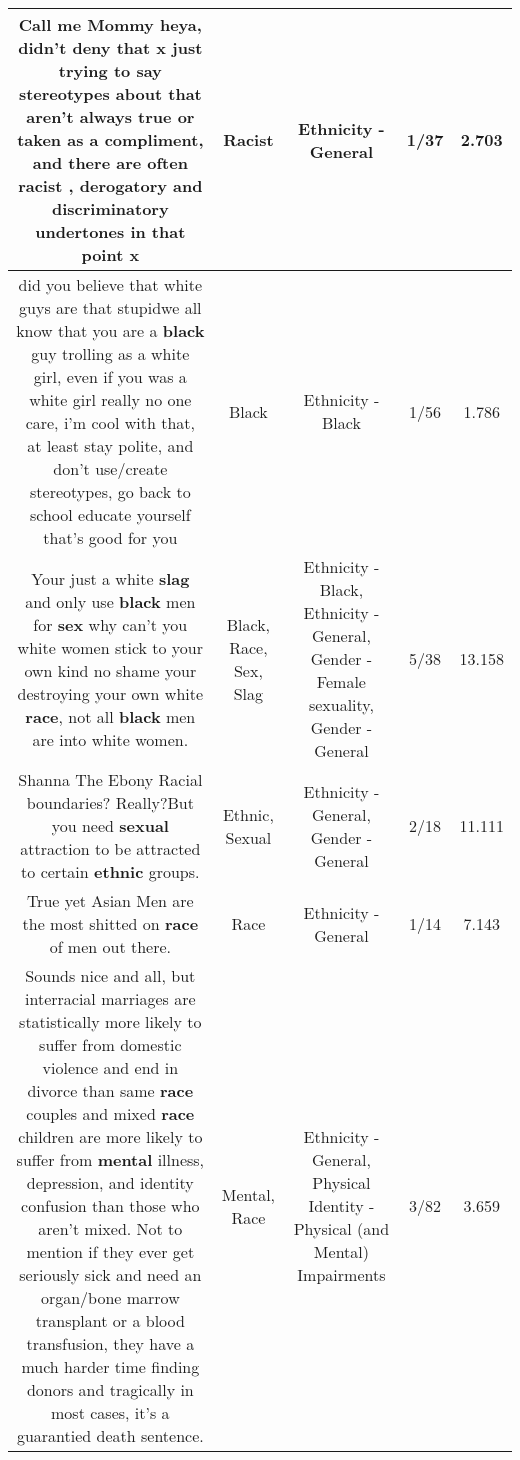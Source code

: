 \documentclass[11pt]{article}
\newlength\mylength
\begin{document}
\begin{center}
\begin{longtable}{|C{.65\mylength}|C{.30\mylength}|C{.12\mylength}|C{.12\mylength}|C{.12\mylength}|}
  \small Call me Mommy heya, didn't deny that x just trying to say stereotypes about that aren't always true or taken as a compliment, and there are often \textbf{racist} , derogatory and discriminatory undertones in that point x\normalsize   & Racist & Ethnicity - General & 1/37 & 2.703 \\  \hline
  \small did you believe that white guys are that stupidwe all know that you are a \textbf{black} guy trolling as a white girl, even if you was a white girl really no one care, i'm cool with that, at least stay polite, and don't use/create stereotypes, go back to school educate yourself that's good for you\normalsize   & Black & Ethnicity - Black & 1/56 & 1.786 \\  \hline
  \small Your just a white \textbf{slag} and only use \textbf{black} men for \textbf{sex} why can't you white women stick to your own kind  no shame your destroying your own white \textbf{race},  not all \textbf{black} men are into white women.\normalsize   & Black, Race, Sex, Slag & Ethnicity - Black, Ethnicity - General, Gender - Female sexuality, Gender - General & 5/38 & 13.158 \\  \hline
  \small Shanna The Ebony Racial boundaries? Really?But you need \textbf{sexual} attraction to be attracted to certain \textbf{ethnic} groups.\normalsize   & Ethnic, Sexual & Ethnicity - General, Gender - General & 2/18 & 11.111 \\  \hline
  \small True yet Asian Men are the most shitted on \textbf{race} of men out there.\normalsize   & Race & Ethnicity - General & 1/14 & 7.143 \\  \hline
  \small Sounds nice and all, but interracial marriages are statistically more likely to suffer from domestic violence and end in divorce than same \textbf{race} couples and mixed \textbf{race} children are more likely to suffer from \textbf{mental} illness, depression, and identity confusion than those who aren't mixed. Not to mention if they ever get seriously sick and need an organ/bone marrow transplant or a blood transfusion, they have a much harder time finding donors and tragically in most cases, it's a guarantied death sentence.\normalsize   & Mental, Race & Ethnicity - General, Physical Identity - Physical (and Mental) Impairments & 3/82 & 3.659 \\  \hline

\end{longtable}
\end{center}
\end{document}
